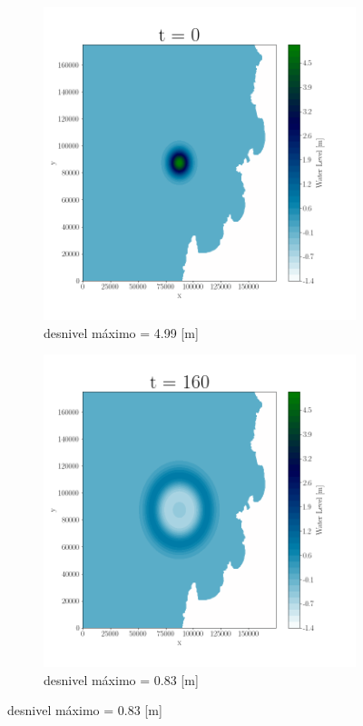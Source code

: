 
\begin{figure}[H]
\centering
\begin{subfigure}[b]{.4\linewidth}
\includegraphics[width=\linewidth]{Figures/Plots/Serena1.png}
\caption{desnivel máximo = 4.99 [m]}
\end{subfigure}
\begin{subfigure}[b]{.4\linewidth}
\includegraphics[width=\linewidth]{Figures/Plots/Serena2.png}
\caption{desnivel máximo = 0.83 [m]}
\end{subfigure}


\end{figure}
